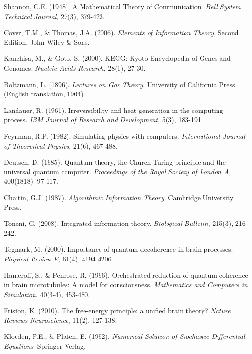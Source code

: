 \documentclass[12pt,a4paper]{article}
\begin{document}
\begin{thebibliography}{99}
Shannon, C.E. (1948). A Mathematical Theory of Communication. \textit{Bell System Technical Journal}, 27(3), 379-423.

Cover, T.M., \& Thomas, J.A. (2006). \textit{Elements of Information Theory}, Second Edition. John Wiley \& Sons.

Kanehisa, M., \& Goto, S. (2000). KEGG: Kyoto Encyclopedia of Genes and Genomes. \textit{Nucleic Acids Research}, 28(1), 27-30.

Boltzmann, L. (1896). \textit{Lectures on Gas Theory}. University of California Press (English translation, 1964).

Landauer, R. (1961). Irreversibility and heat generation in the computing process. \textit{IBM Journal of Research and Development}, 5(3), 183-191.

Feynman, R.P. (1982). Simulating physics with computers. \textit{International Journal of Theoretical Physics}, 21(6), 467-488.

Deutsch, D. (1985). Quantum theory, the Church-Turing principle and the universal quantum computer. \textit{Proceedings of the Royal Society of London A}, 400(1818), 97-117.

Chaitin, G.J. (1987). \textit{Algorithmic Information Theory}. Cambridge University Press.

Tononi, G. (2008). Integrated information theory. \textit{Biological Bulletin}, 215(3), 216-242.

Tegmark, M. (2000). Importance of quantum decoherence in brain processes. \textit{Physical Review E}, 61(4), 4194-4206.

Hameroff, S., \& Penrose, R. (1996). Orchestrated reduction of quantum coherence in brain microtubules: A model for consciousness. \textit{Mathematics and Computers in Simulation}, 40(3-4), 453-480.

Friston, K. (2010). The free-energy principle: a unified brain theory? \textit{Nature Reviews Neuroscience}, 11(2), 127-138.

Kloeden, P.E., \& Platen, E. (1992). \textit{Numerical Solution of Stochastic Differential Equations}. Springer-Verlag.


\end{thebibliography}
\end{document}
